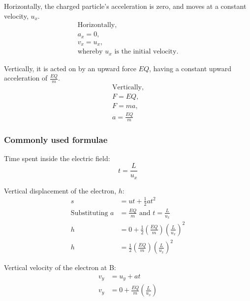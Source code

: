 \documentclass[../../../main.tex]{subfiles}
\begin{document}
Horizontally, the charged particle's acceleration is zero, and moves at a constant velocity, \(u_x\).
\begin{gather*}
    \text{Horizontally, } \\
    a_x =0,               \\
    v_x =u_x,               \\
    \text{whereby \(u_x\) is the initial velocity.}
\end{gather*}

Vertically, it is acted on by an upward force \(EQ\), having a constant upward acceleration of $\frac{EQ}{m}$.
\begin{gather*}
    \text{Vertically,} \\
    F=EQ,             \\
    F=ma,             \\
    a=\frac{EQ}{m}
\end{gather*}

\newpage

\subsubsection{Commonly used formulae}
\begin{mdframed}
    Time spent inside the electric field:
    \begin{equation}
        t=\frac{L}{u_x}
    \end{equation}
\end{mdframed}

\begin{mdframed}
    Vertical displacement of the electron, \(h\):
    \begin{align}
        s                      & =ut+\frac{1}{2}at^2                           \\
        \text{Substituting } a & =\frac{EQ}{m} \text{ and } t=\frac{L}{u_x}    \\
        h                      & =0+\frac{1}{2}(\frac{EQ}{m})(\frac{L}{u_x})^2 \\
        h                      & =\frac{1}{2}(\frac{EQ}{m})(\frac{L}{u_x})^2
    \end{align}
\end{mdframed}

\begin{mdframed}
    Vertical velocity of the electron at B:
    \begin{align}
        v_y & =u_y+at                        \\
        v_y & =0+\frac{EQ}{m}(\frac{L}{u_x})
    \end{align}
\end{mdframed}
\end{document}

